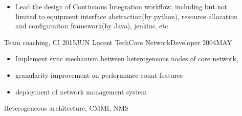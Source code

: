 \begin{experiences}
{\begin{itemize}
			\item Lead the design of Continuous Integration workflow, including but not limited to equipment interface abstraction(by python), resource allocation and configuraiton framework(by Java), jenkins, etc
		\end{itemize}
	}
	{Team coaching, CI}
	\emptySeparator
	\experience
	{2015JUN} {Lucent Tech}{Core Network}{Developer}
	{2004MAY}    {
		\begin{itemize}
			\item Implement sync mechanism between heterogeneous nodes of core network,
			\item granularity improvement on performance count features
			\item deployment of network management system
		\end{itemize}
	}
	{Heterogeneous architecture, CMMI, NMS}
\end{experiences}
